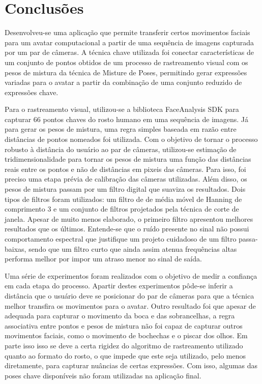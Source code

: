 \chapter{Conclusões}

\label{CapConclusoes}

Desenvolveu-se uma aplicação que permite transferir certos movimentos faciais para um avatar computacional a partir de uma sequência de imagens capturada por um par de câmeras. A técnica chave utilizada foi conectar características de um conjunto de pontos obtidos de um processo de rastreamento visual com os pesos de mistura da técnica de Misture de Poses, permitindo gerar expressões variadas para o avatar a partir da combinação de uma conjunto reduzido de expressões chave. 

Para o rastreamento visual, utilizou-se a biblioteca FaceAnalysis SDK para capturar 66 pontos chaves do rosto humano em uma sequência de imagens. Já para gerar os pesos de mistura, uma regra simples baseada em razão entre distâncias de pontos nomeados foi utilizada. Com o objetivo de tornar o processo robusto à distância do usuário ao par de câmeras, utilizou-se estimação de tridimensionalidade para tornar os pesos de mistura uma função das distâncias reais entre os pontos e não de distâncias em pixeis das câmeras. Para isso, foi preciso uma etapa prévia de calibração das câmeras utilizadas. Além disso, os pesos de mistura passam por um filtro digital que suaviza os resultados. Dois tipos de filtros foram utilizados: um filtro de de média móvel de Hanning de comprimento 3 e um conjunto de filtros projetados pela técnica de corte de janela.  Apesar de muito menos elaborado, o primeiro filtro apresentou melhores resultados que os últimos. Entende-se que o ruído presente no sinal não possui comportamento espectral que justifique um projeto cuidadoso de um filtro passa-baixas, sendo que um filtro curto que ainda assim atenua frequências altas performa melhor por impor um atraso menor no sinal de saída.

Uma série de experimentos foram realizados com o objetivo de medir a confiança em cada etapa do processo. Apartir destes experimentos pôde-se inferir a distância que o usuário deve se posicionar do par de câmeras para que a técnica melhor transfira os movimentos para o avatar. Outro resultado foi que apesar de adequada para capturar o movimento da boca e das sobrancelhas, a regra associativa entre pontos e pesos de mistura não foi capaz de capturar outros movimentos faciais, como o movimento de bochechas e o piscar dos olhos. Em parte isso isso se deve a certa rigidez do algoritmo de rastreamento utilizado quanto ao formato do rosto, o que impede que este seja utilizado, pelo menos diretamente, para capturar nuâncias de certas expressões. Com isso, algumas das poses chave disponíveis não foram utilizadas na aplicação final.

